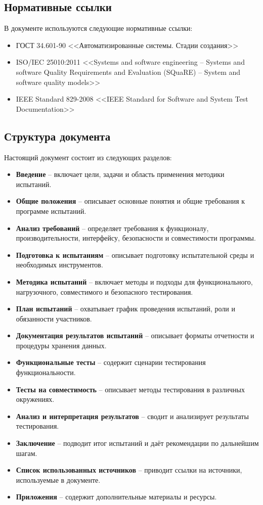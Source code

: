 \documentclass{article}
\begin{document}
    \subsection{Нормативные ссылки}
    В документе используются следующие нормативные ссылки:
    \begin{itemize}
        \item ГОСТ 34.601-90 <<Автоматизированные системы. Стадии создания>>\cite{litlink1}
        \item ISO/IEC 25010:2011 <<Systems and software engineering -- Systems and software Quality Requirements and Evaluation (SQuaRE) -- System and software quality models>>\cite{litlink2}
        \item IEEE Standard 829-2008 <<IEEE Standard for Software and System Test Documentation>>\cite{litlink3}
    \end{itemize}

    \subsection{Структура документа}
    Настоящий документ состоит из следующих разделов:
    \begin{itemize}
        \item \textbf{Введение} -- включает цели, задачи и область применения методики испытаний.
        \item \textbf{Общие положения} -- описывает основные понятия и общие требования к программе испытаний.
        \item \textbf{Анализ требований} -- определяет требования к функционалу, производительности, интерфейсу, безопасности и совместимости программы.
        \item \textbf{Подготовка к испытаниям} -- описывает подготовку испытательной среды и необходимых инструментов.
        \item \textbf{Методика испытаний} -- включает методы и подходы для функционального, нагрузочного, совместимого и безопасного тестирования.
        \item \textbf{План испытаний} -- охватывает график проведения испытаний, роли и обязанности участников.
        \item \textbf{Документация результатов испытаний} -- описывает форматы отчетности и процедуры хранения данных.
        \item \textbf{Функциональные тесты} -- содержит сценарии тестирования функциональности.
        \item \textbf{Тесты на совместимость} -- описывает методы тестирования в различных окружениях.
        \item \textbf{Анализ и интерпретация результатов} -- сводит и анализирует результаты тестирования.
        \item \textbf{Заключение} -- подводит итог испытаний и даёт рекомендации по дальнейшим шагам.
        \item \textbf{Список использованных источников} -- приводит ссылки на источники, используемые в документе.
        \item \textbf{Приложения} -- содержит дополнительные материалы и ресурсы.
    \end{itemize}
\end{document}
